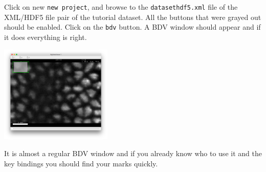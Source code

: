 Click on new \texttt{new project}, and browse to the \texttt{datasethdf5.xml} file of the XML/HDF5 file pair of the tutorial dataset.
All the buttons that were grayed out should be enabled. 
Click on the \texttt{bdv} button.
A BDV window should appear and if it does everything is right.
\begin{center}
         \includegraphics[width=0.4\textwidth]{figures/Mastodon_BDV.png}
\end{center}

It is almost a regular BDV window and if you already know who to use it and the key bindings you should find your marks quickly.
